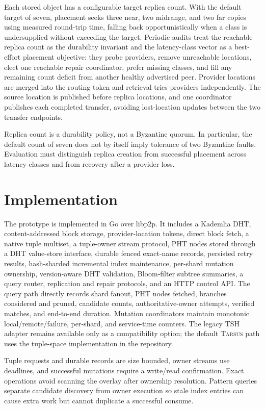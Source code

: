 \documentclass[conference]{IEEEtran}
\newcommand{\system}{\textsc{Tarsus}\xspace}
\begin{document}
Each stored object has a configurable target replica count. With the default
target of seven, placement seeks three near, two midrange, and two far copies
using measured round-trip time, falling back opportunistically when a class is
undersupplied without exceeding the target. Periodic audits treat the reachable
replica count as the durability invariant and the latency-class vector as a
best-effort placement objective: they probe providers, remove unreachable
locations, elect one reachable repair coordinator, prefer missing classes, and
fill any remaining count deficit from another healthy advertised peer.
Provider locations are merged into the routing token and retrieval tries
providers independently. The source location is published before replica
locations, and one coordinator publishes each completed transfer, avoiding
lost-location updates between the two transfer endpoints.

Replica count is a durability policy, not a Byzantine quorum. In particular,
the default count of seven does not by itself imply tolerance of two Byzantine
faults. Evaluation must distinguish replica creation from successful placement
across latency classes and from recovery after a provider loss.

\section{Implementation}
\label{sec:implementation}

The prototype is implemented in Go over libp2p. It includes a Kademlia DHT,
content-addressed block storage, provider-location tokens, direct block fetch,
a native tuple multiset, a tuple-owner stream protocol, PHT nodes stored through
a DHT value-store interface, durable fenced exact-name records, persisted
retry results, hash-sharded incremental index maintenance,
per-shard mutation ownership, version-aware DHT validation, Bloom-filter
subtree summaries, a query router, replication and repair protocols, and an
HTTP control API. The query path directly records shard fanout, PHT nodes
fetched, branches considered and pruned, candidate counts, authoritative-owner
attempts, verified matches, and end-to-end duration. Mutation coordinators
maintain monotonic local/remote/failure, per-shard, and service-time counters.
The legacy TSH adapter remains
available only as a compatibility option; the default \system path uses the
tuple-space implementation in the repository.

Tuple requests and durable records are size bounded, owner streams use
deadlines, and successful mutations require a write/read confirmation. Exact
operations avoid scanning the overlay after ownership resolution. Pattern
queries separate candidate discovery from owner execution so stale index
entries can cause extra work but cannot duplicate a successful consume.
\end{document}
